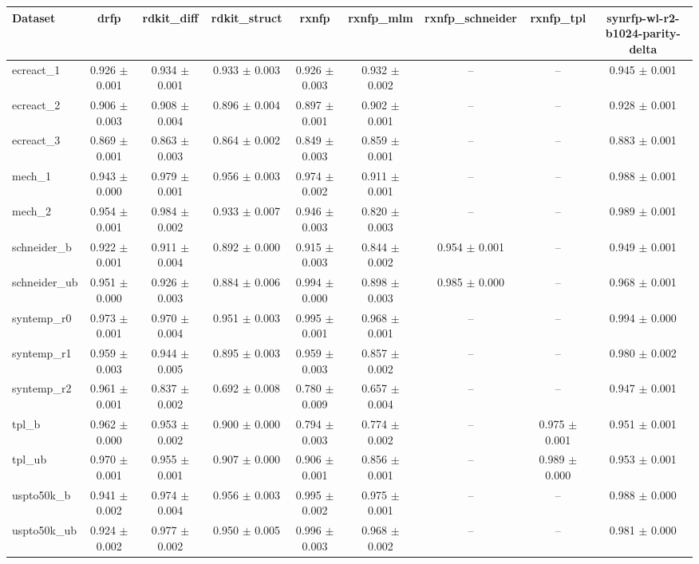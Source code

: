 \begin{tabular}{lcccccccc}
\toprule
Dataset & drfp & rdkit\_diff & rdkit\_struct & rxnfp & rxnfp\_mlm & rxnfp\_schneider & rxnfp\_tpl & synrfp-wl-r2-b1024-parity-delta \\
\midrule
ecreact\_1 & 0.926 $\pm$ 0.001 & 0.934 $\pm$ 0.001 & 0.933 $\pm$ 0.003 & 0.926 $\pm$ 0.003 & 0.932 $\pm$ 0.002 & -- & -- & 0.945 $\pm$ 0.001 \\
ecreact\_2 & 0.906 $\pm$ 0.003 & 0.908 $\pm$ 0.004 & 0.896 $\pm$ 0.004 & 0.897 $\pm$ 0.001 & 0.902 $\pm$ 0.001 & -- & -- & 0.928 $\pm$ 0.001 \\
ecreact\_3 & 0.869 $\pm$ 0.001 & 0.863 $\pm$ 0.003 & 0.864 $\pm$ 0.002 & 0.849 $\pm$ 0.003 & 0.859 $\pm$ 0.001 & -- & -- & 0.883 $\pm$ 0.001 \\
mech\_1 & 0.943 $\pm$ 0.000 & 0.979 $\pm$ 0.001 & 0.956 $\pm$ 0.003 & 0.974 $\pm$ 0.002 & 0.911 $\pm$ 0.001 & -- & -- & 0.988 $\pm$ 0.001 \\
mech\_2 & 0.954 $\pm$ 0.001 & 0.984 $\pm$ 0.002 & 0.933 $\pm$ 0.007 & 0.946 $\pm$ 0.003 & 0.820 $\pm$ 0.003 & -- & -- & 0.989 $\pm$ 0.001 \\
schneider\_b & 0.922 $\pm$ 0.001 & 0.911 $\pm$ 0.004 & 0.892 $\pm$ 0.000 & 0.915 $\pm$ 0.003 & 0.844 $\pm$ 0.002 & 0.954 $\pm$ 0.001 & -- & 0.949 $\pm$ 0.001 \\
schneider\_ub & 0.951 $\pm$ 0.000 & 0.926 $\pm$ 0.003 & 0.884 $\pm$ 0.006 & 0.994 $\pm$ 0.000 & 0.898 $\pm$ 0.003 & 0.985 $\pm$ 0.000 & -- & 0.968 $\pm$ 0.001 \\
syntemp\_r0 & 0.973 $\pm$ 0.001 & 0.970 $\pm$ 0.004 & 0.951 $\pm$ 0.003 & 0.995 $\pm$ 0.001 & 0.968 $\pm$ 0.001 & -- & -- & 0.994 $\pm$ 0.000 \\
syntemp\_r1 & 0.959 $\pm$ 0.003 & 0.944 $\pm$ 0.005 & 0.895 $\pm$ 0.003 & 0.959 $\pm$ 0.003 & 0.857 $\pm$ 0.002 & -- & -- & 0.980 $\pm$ 0.002 \\
syntemp\_r2 & 0.961 $\pm$ 0.001 & 0.837 $\pm$ 0.002 & 0.692 $\pm$ 0.008 & 0.780 $\pm$ 0.009 & 0.657 $\pm$ 0.004 & -- & -- & 0.947 $\pm$ 0.001 \\
tpl\_b & 0.962 $\pm$ 0.000 & 0.953 $\pm$ 0.002 & 0.900 $\pm$ 0.000 & 0.794 $\pm$ 0.003 & 0.774 $\pm$ 0.002 & -- & 0.975 $\pm$ 0.001 & 0.951 $\pm$ 0.001 \\
tpl\_ub & 0.970 $\pm$ 0.001 & 0.955 $\pm$ 0.001 & 0.907 $\pm$ 0.000 & 0.906 $\pm$ 0.001 & 0.856 $\pm$ 0.001 & -- & 0.989 $\pm$ 0.000 & 0.953 $\pm$ 0.001 \\
uspto50k\_b & 0.941 $\pm$ 0.002 & 0.974 $\pm$ 0.004 & 0.956 $\pm$ 0.003 & 0.995 $\pm$ 0.002 & 0.975 $\pm$ 0.001 & -- & -- & 0.988 $\pm$ 0.000 \\
uspto50k\_ub & 0.924 $\pm$ 0.002 & 0.977 $\pm$ 0.002 & 0.950 $\pm$ 0.005 & 0.996 $\pm$ 0.003 & 0.968 $\pm$ 0.002 & -- & -- & 0.981 $\pm$ 0.000 \\
\bottomrule
\end{tabular}
